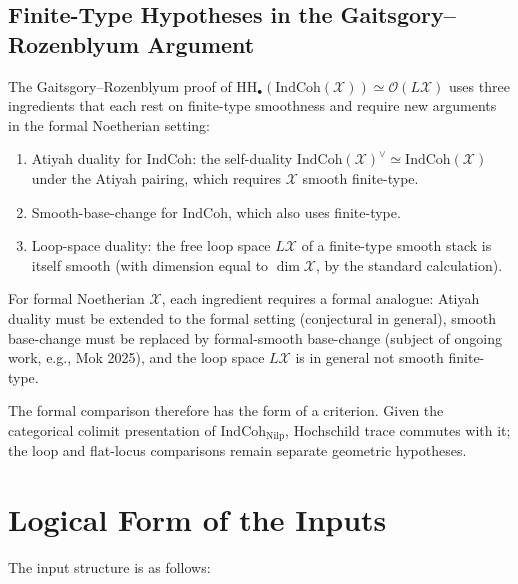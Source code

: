 \subsection{Finite-Type Hypotheses in the Gaitsgory--Rozenblyum Argument}

The Gaitsgory--Rozenblyum proof of
\(\mathrm{HH}_{\bullet}(\mathrm{IndCoh}(\mathcal{X}))\simeq\mathcal{O}(L\mathcal{X})\)
uses three ingredients that each rest on finite-type smoothness
and require new arguments in the formal Noetherian setting:
\begin{enumerate}
\item Atiyah duality for \(\mathrm{IndCoh}\): the self-duality
\(\mathrm{IndCoh}(\mathcal{X})^{\vee}\simeq\mathrm{IndCoh}(\mathcal{X})\)
under the Atiyah pairing, which requires \(\mathcal{X}\) smooth
finite-type.
\item Smooth-base-change for \(\mathrm{IndCoh}\), which also uses
finite-type.
\item Loop-space duality: the free loop space \(L\mathcal{X}\) of a
finite-type smooth stack is itself smooth (with dimension equal to
\(\dim\mathcal{X}\), by the standard calculation).
\end{enumerate}
For formal Noetherian \(\mathcal{X}\), each ingredient requires a formal
analogue: Atiyah duality must be extended to the formal setting (conjectural
in general), smooth base-change must be replaced by formal-smooth
base-change (subject of ongoing work, e.g., Mok 2025),
and the loop space \(L\mathcal{X}\) is in general not smooth finite-type.

The formal comparison therefore has the form of a criterion. Given
the categorical colimit presentation of
\(\mathrm{IndCoh}_{\mathrm{Nilp}}\), Hochschild trace commutes with it;
the loop and flat-locus comparisons remain separate geometric
hypotheses.

\section{Logical Form of the Inputs}
\label{v4-arith:bzn-sub:table}

The input structure is as follows:

